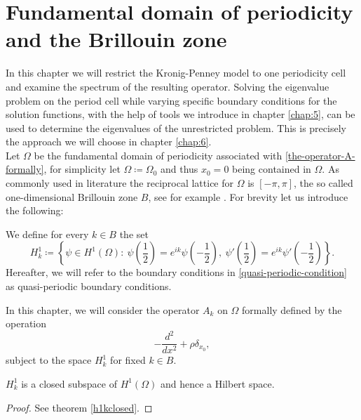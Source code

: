 \chapter{Fundamental domain of periodicity and the Brillouin zone}  \label{chap:4}

In this chapter we will restrict the Kronig-Penney model to one periodicity cell and examine the spectrum of the resulting operator. Solving the eigenvalue problem on the period cell while varying specific boundary conditions for the solution functions, with the help of tools we introduce in chapter \ref{chap:5}, can be used to determine the eigenvalues of the unrestricted problem. This is precisely the approach we will choose in chapter \ref{chap:6}.
~\\ 

Let $\Omega$ be the fundamental domain of periodicity associated with \eqref{the-operator-A-formally}, for simplicity let $\Omega \coloneqq \Omega_{0}$ and thus $x_{0} = 0$ being contained in $\Omega$. As commonly used in literature the reciprocal lattice for $\Omega$ is $[-\pi, \pi]$, the so called one-dimensional Brillouin zone $B$, see for example \cite[chapter 3]{dorfler2011photonic}. For brevity let us introduce the following:
\begin{definition} 
	We define for every $k \in B$ the set  
	\begin{equation} 
		H^{1}_{k} \coloneqq \left\{ \psi \in H^{1}(\Omega): ~ \psi\left(\frac{1}{2}\right) = e^{ik} \psi\left(-\frac{1}{2}\right), ~ \psi'\left(\frac{1}{2}\right) = e^{ik} \psi'\left(-\frac{1}{2}\right) \right\}. \label{quasi-periodic-condition} %
	\end{equation}
	Hereafter, we will refer to the boundary conditions in \eqref{quasi-periodic-condition} as quasi-periodic boundary conditions.
\end{definition}
In this chapter, we will consider the operator $A_{k}$ on $\Omega$ formally defined by the operation 
	\[ -\frac{d^{2}}{dx^{2}} + \rho \delta_{x_{0}}, \]
subject to the space $H^{1}_{k}$ for fixed $k \in B$.
	
\begin{remark}
	$H^{1}_{k}$ is a closed subspace of $H^{1}(\Omega)$ and hence a Hilbert space.
\end{remark}

\begin{proof}
	See theorem \ref{h1kclosed}.
\end{proof}

